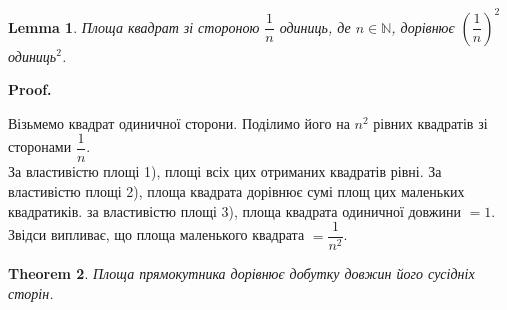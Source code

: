 \documentclass[a4paper, 10pt]{article}
\makeatletter
\theoremstyle{theoremdd}
\newtheorem{theorem}{Theorem}[subsection]
\theoremstyle{theoremdd}
\theoremstyle{theoremdd}
\theoremstyle{theoremdd}
\theoremstyle{theoremdd}
\theoremstyle{theoremdd}
\theoremstyle{theoremdd}
\theoremstyle{theoremdd}
\newtheorem{lemma}[theorem]{Lemma}
\theoremstyle{theoremdd}
\renewenvironment{proof}[1][Proof.\\]{\par
\pushQED{\hfill \qed}%
\normalfont \topsep6\p@\@plus6\p@\relax
\trivlist
\item\relax
{\bfseries
#1\@addpunct{.}}\hspace\labelsep\ignorespaces
}{%
\popQED\endtrivlist\@endpefalse
}
\makeatother
\begin{document}
\begin{lemma}
Площа квадрат зі стороною $\dfrac{1}{n}$ одиниць, де $n \in \mathbb{N}$, дорівнює $\left(\dfrac{1}{n}\right)^2$ одиниць$^2$.
\end{lemma}

\begin{proof}
Візьмемо квадрат одиничної сторони. Поділимо його на $n^2$ рівних квадратів зі сторонами $\dfrac{1}{n}$.\\
За властивістю площі 1), площі всіх цих отриманих квадратів рівні. За властивістю площі 2), площа квадрата дорівнює сумі площ цих маленьких квадратиків. за властивістю площі 3), площа квадрата одиничної довжини $= 1$.\\
Звідси випливає, що площа маленького квадрата $= \dfrac{1}{n^2}$.
\end{proof}

\begin{theorem}
Площа прямокутника дорівнює добутку довжин його сусідніх сторін.
\end{theorem}
\end{document}
